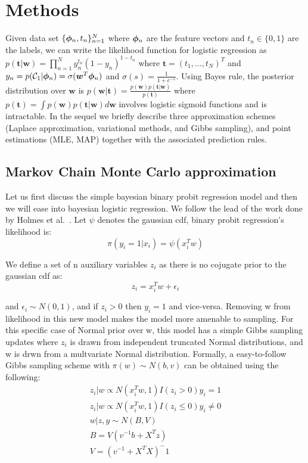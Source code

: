 \section{Methods}
Given data set $\{\bm{\phi}_n, t_n\}_{n=1}^N$ where $\bm{\phi}_n$ are the feature
vectors and $t_n\in \{0,1\}$ are the labels, we can write the likelihood
function for logistic regression as $p(\bm{t}|\bm{w}) = \prod_{n=1}^N
y_n^{t_n} (1-y_n)^{1-t_n}$ where $\bm{t} = (t_1,...,t_N)^T$ and
$y_n=p(\mathcal{C}_1|\bm{\phi}_n) = \sigma(\bm{w}^T \bm{\phi}_n)$ and $\sigma(s) =
\frac{1}{1+e^{-s}}$. Using Bayes rule, the posterior distribution over
$\bm{w}$ is $p(\bm{w}|\bm{t}) = \frac{p(\bm{w}) p(\bm{t}|\bm{w})}{p(\bm{t})}$
where $p(\bm{t}) = \int p(\bm{w})p(\bm{t}|\bm{w}) d\bm{w}$ involves logistic
sigmoid functions and is intractable. In the sequel we briefly describe three
approximation schemes (Laplace approximation, variational methods, and Gibbs
sampling), and point estimations (MLE, MAP) together with the associated
prediction rules.

\subsection{Markov Chain Monte Carlo approximation}
\label{sec:MCMCmethod}
Let us first discuss the simple bayesian binary probit regression model and 
then we will ease into bayesian logistic regression. We follow the lead of
the work done by Holmes et al.~\cite{Holmes}. Let $\psi$ denotes the gaussian
cdf, binary probit regression's likelihood is:
\begin{equation}
\pi(y_i=1|x_i) = \psi(x_i^Tw)
\end{equation}

We define a set of n auxiliary variables $z_i$ as there is no cojugate prior to
the gaussian cdf as:
\begin{equation}
z_i=x_i^Tw+\epsilon_i
\end{equation}

and $\epsilon_i \sim N(0,1)$, and if $z_i>0$ then $y_i=1$ and vice-versa.
Removing w from likelihood in this new model makes the model more amenable
to sampling. For this
specific case of  Normal prior over w, this model has a simple
Gibbs sampling updates where $z_i$ is drawn from independent 
truncated Normal distributions, and w is drwn from a multvariate Normal
distribution. Formally, a easy-to-follow Gibbs sampling scheme with
$\pi(w)\sim N(b,v)$ can be obtained using the following:
\begin{eqnarray}
z_i|w \propto N(x_i^Tw,1)I(z_i>0)y_i=1 \\
z_i|w \propto N(x_i^Tw,1)I(z_i\leq 0)y_i\neq 0 \\
w|z,y \sim N(B,V) \\
B = V(v^{-1}b+X^Tz) \\
V=(v^{-1}+X^TX)^-1 \\
\end{eqnarray}

